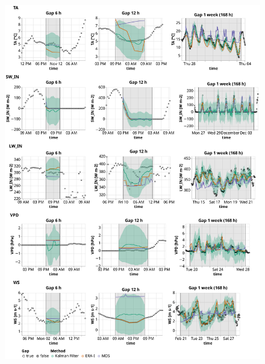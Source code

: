 \documentclass{article}
\let\Oldsubsection\subsection
\renewcommand{\subsection}{\FloatBarrier\Oldsubsection}
\begin{document}
\newcommand{\CapTheTableStand}{Imputation performance of the Kalman filter in comparison to the state-of-the-art
methods: ERA-Interim (ERA-I) and Marginal Distribution Sampling (MDS), using mean and standard deviation of the \textit{Root Mean Square Error} (RMSE). The best method for each gap length is highlighted in bold. For each combination of gap length and variable, 500 artificial gaps were created.}


\begin{figure}
\centerline{\includegraphics[width=5.7in]{timeseries_1_1}}
\caption{}
\label{fig:ts_2-1}
\end{figure}
\end{document}

